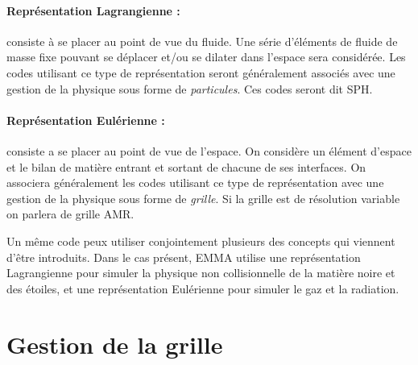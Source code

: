 \paragraph{Représentation Lagrangienne : } 
consiste à se placer au point de vue du fluide.
Une série d'éléments de fluide de masse fixe pouvant se déplacer et/ou se dilater dans l'espace sera considérée.
Les codes utilisant ce type de représentation seront généralement associés avec une gestion de la physique sous forme de \emph{particules}.
Ces codes seront dit \ac{SPH}.


\paragraph{Représentation Eulérienne : } 
consiste a se placer au point de vue de l'espace.
On considère un élément d'espace et le bilan de matière entrant et sortant de chacune de ses interfaces.
On associera généralement les codes utilisant ce type de représentation avec une gestion de la physique sous forme de \emph{grille}.
Si la grille est de résolution variable on parlera de grille \ac{AMR}.


Un même code peux utiliser conjointement plusieurs des concepts qui viennent d'être introduits.
Dans le cas présent, EMMA utilise une représentation Lagrangienne pour simuler la physique non collisionnelle de la matière noire et des étoiles, et une représentation Eulérienne pour simuler le gaz et la radiation.

\section{Gestion de la grille}
\label{sec_gestion_grille}

